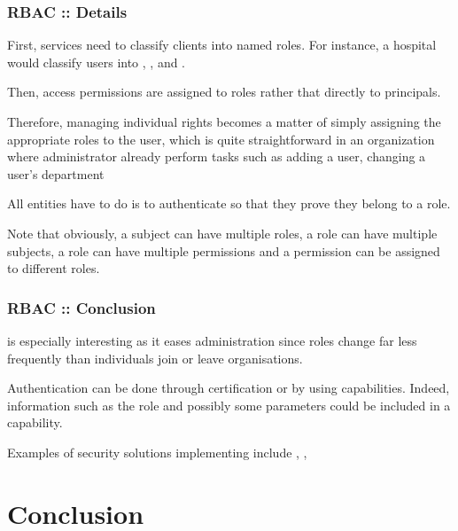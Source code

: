 
\begin{frame}
  \frametitle{RBAC :: Details}

  First, services need to classify clients into named roles. For instance,
  a hospital would classify users into , ,
   and .

  \-

  Then, access permissions are assigned to roles rather that directly to
  principals.

  \-

  Therefore, managing individual rights becomes a matter of simply assigning
  the appropriate roles to the user, which is quite straightforward in
  an organization where administrator already perform tasks such as adding
  a user, changing a user's department \etc{}

  \-

  All entities have to do is to authenticate so that they prove they belong
  to a role.

  \-

  Note that obviously, a subject can have multiple roles, a role can have
  multiple subjects, a role can have multiple permissions and a permission
  can be assigned to different roles.
\end{frame}


\begin{frame}
  \frametitle{RBAC :: Conclusion}

   is especially interesting as it eases administration since
  roles change far less frequently than individuals join or leave
  organisations.

  \-

  Authentication can be done through certification or by using capabilities.
  Indeed,  information such as the role and possibly some
  parameters could be included in a capability.

  \-

  Examples of security solutions implementing  include
  , ,  \etc{}
\end{frame}

%
%

\section{Conclusion}

